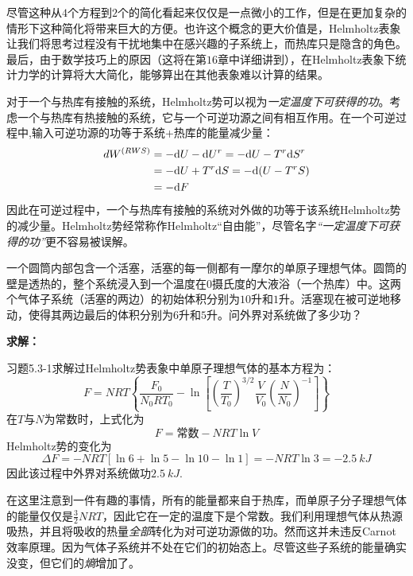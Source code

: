 尽管这种从$4$个方程到$2$个的简化看起来仅仅是一点微小的工作，但是在更加复杂的情形下这种简化将带来巨大的方便。也许这个概念的更大价值是，Helmholtz表象让我们将思考过程没有干扰地集中在感兴趣的子系统上，而热库只是隐含的角色。最后，由于数学技巧上的原因（这将在第$16$章中详细讲到），在Helmholtz表象下统计力学的计算将大大简化，能够算出在其他表象难以计算的结果。

对于一个与热库有接触的系统，Helmholtz势可以视为{\it 一定温度下可获得的功}。考虑一个与热库有热接触的系统，它与一个可逆功源之间有相互作用。在一个可逆过程中,输入可逆功源的功等于系统+热库的能量减少量：
\begin{align}
\label{equ6.25}
	dW^{(RWS)} &= -\mathrm{d} U - \mathrm{d} U^r = -\mathrm{d} U - T^r \mathrm{d} S^r \\
\label{equ6.26}
	&= -\mathrm{d} U + T^r \mathrm{d} S = -\mathrm{d} (U - T^r S) \\
\label{equ6.27}
    &= -\mathrm{d} F
\end{align}
因此在可逆过程中，一个与热库有接触的系统对外做的功等于该系统Helmholtz势的减少量。Helmholtz势经常称作Helmholtz“自由能”，尽管名字{\it “一定温度下可获得的功”}更不容易被误解。

\begin{example}
一个圆筒内部包含一个活塞，活塞的每一侧都有一摩尔的单原子理想气体。圆筒的壁是透热的，整个系统浸入到一个温度在$0$摄氏度的大液浴（一个热库）中。这两个气体子系统（活塞的两边）的初始体积分别为$10$升和$1$升。活塞现在被可逆地移动，使得其两边最后的体积分别为$6$升和$5$升。问外界对系统做了多少功？

{\bf 求解：}

习题5.3-1求解过Helmholtz势表象中单原子理想气体的基本方程为：
\begin{equation*}
	F = NRT \left\{\frac{F_0}{N_0RT_0} - \ln \left[\left(\frac{T}{T_0}\right)^{3/2}\frac{V}{V_0}\left(\frac{N}{N_0}\right)^{-1} \right]\right\}
\end{equation*}
在$T$与$N$为常数时，上式化为
\begin{equation*}
	F = \text{常数} - NRT \ln V
\end{equation*}
Helmholtz势的变化为
\begin{equation*}
	\Delta F = -NRT [\ln 6 + \ln 5 - \ln 10 - \ln1] = -NRT \ln 3 = -\SI{2.5}{kJ}
\end{equation*}
因此该过程中外界对系统做功$\SI{2.5}{kJ}$.
\end{example}

在这里注意到一件有趣的事情，所有的能量都来自于热库，而单原子分子理想气体的能量仅仅是$\frac{3}{2}NRT$，因此它在一定的温度下是个常数。我们利用理想气体从热源吸热，并且将吸收的热量{\it 全部}转化为对可逆功源做的功。然而这并未违反Carnot效率原理。因为气体子系统并不处在它们的初始态上。尽管这些子系统的能量确实没变，但它们的{\it 熵}增加了。

